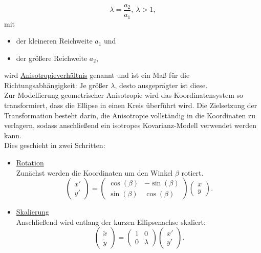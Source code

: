 \begin{equation*}
\lambda =
\frac{a_2}{a_1},\ \lambda > 1,
\end{equation*}
mit 
\begin{itemize}[topsep=2pt,parsep=1pt,itemsep=0.5pt]
\item[$\circ$] der kleineren Reichweite $a_1$ und
\item[$\circ$] der größere Reichweite $a_2$,
\end{itemize}
wird \underline{Anisotropieverhältnis} genannt und ist ein Maß 
für die Richtungsabhängigkeit:
Je größer $\lambda$, desto ausgeprägter ist diese.\\

Zur Modellierung geometrischer Anisotropie wird das 
Koordinatensystem so transformiert, dass die Ellipse in einen Kreis
 überführt wird. Die Zielsetzung der Transformation besteht darin,
die Anisotropie vollständig in die Koordinaten zu verlagern,
sodass anschließend ein isotropes Kovarianz-Modell verwendet werden 
kann.\\

Dies geschieht in zwei Schritten:
\begin{itemize}
\item[ 1)] \underline{Rotation} \\
Zunächst werden die Koordinaten um den Winkel $\beta$
rotiert.
\begin{equation*}
\begin{pmatrix}
x'\\
y'
\end{pmatrix}
=
\begin{pmatrix}
\cos(\beta) & -\sin(\beta)\\
\sin(\beta) & \cos(\beta)
\end{pmatrix}
\begin{pmatrix}
x\\
y
\end{pmatrix}.
\end{equation*}

\item[ 2) ] \underline{Skalierung}\\
Anschließend wird entlang der kurzen Ellipsenachse skaliert:
\begin{equation*}
\begin{pmatrix}
\tilde{x} \\
\tilde{y}
\end{pmatrix}
=
\begin{pmatrix}
1&0\\
0&\lambda
\end{pmatrix}
\begin{pmatrix}
x'\\
y'
\end{pmatrix}.
\end{equation*}
\end{itemize}


